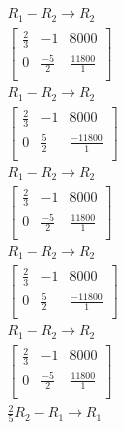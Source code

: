 \documentclass[12pt letter]{report}
\begin{document}
{  \begin{align*}
    \\
    R_1 - R_2  \rightarrow R_2                                                             \\
    \begin{bmatrix}
      \frac{2}{3} & -1           & 8000            \\
      0           & \frac{-5}{2} & \frac{11800}{1} \\
    \end{bmatrix}
    \\
    R_1 - R_2  \rightarrow R_2                                                             \\
    \begin{bmatrix}
      \frac{2}{3} & -1          & 8000             \\
      0           & \frac{5}{2} & \frac{-11800}{1} \\
    \end{bmatrix}
    \\
    R_1 - R_2  \rightarrow R_2                                                             \\
    \begin{bmatrix}
      \frac{2}{3} & -1           & 8000            \\
      0           & \frac{-5}{2} & \frac{11800}{1} \\
    \end{bmatrix}
    \\
    R_1 - R_2  \rightarrow R_2                                                             \\
    \begin{bmatrix}
      \frac{2}{3} & -1          & 8000             \\
      0           & \frac{5}{2} & \frac{-11800}{1} \\
    \end{bmatrix}
    \\
    R_1 - R_2  \rightarrow R_2                                                             \\
    \begin{bmatrix}
      \frac{2}{3} & -1           & 8000            \\
      0           & \frac{-5}{2} & \frac{11800}{1} \\
    \end{bmatrix}
    \\
    \frac{2}{5}R_2 - R_1  \rightarrow R_1                                                  \\

\end{align*}}
\end{document}
